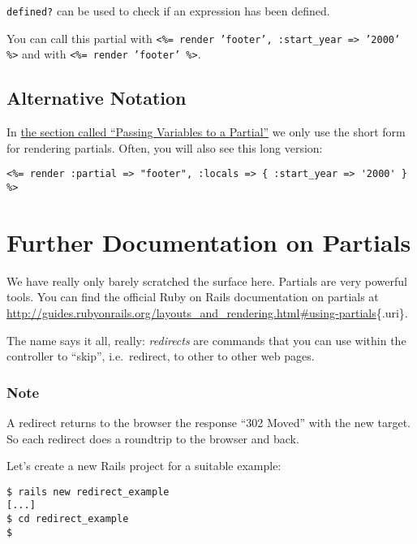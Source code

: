 \documentclass[a4paper]{book}
\newcounter{tab}[chapter]
\newcommand{\chap}[1]{\newpage\thispagestyle{empty}\chapter{#1}\label{chap:\thechapter}}
\begin{document}
\texttt{defined?} can be used to check if an expression has been defined.

You can call this partial with \texttt{\textless{}\%= render 'footer',         :start\_year =\textgreater{} '2000' \%\textgreater{}} and with \texttt{\textless{}\%= render         'footer' \%\textgreater{}}.

\section{Alternative Notation}\label{alternative-notation}

In \hyperref[partialsux5flocaleux5fvariables]{the section called “Passing Variables to a Partial”} we only use the short form for rendering partials. Often, you will also see this long version:

\begin{shaded}\begin{verbatim}
<%= render :partial => "footer", :locals => { :start_year => '2000' } %>
\end{verbatim}\end{shaded}

\chap{Further Documentation on Partials}\label{further-documentation-on-partials}

We have really only barely scratched the surface here. Partials are very powerful tools. You can find the official Ruby on Rails documentation on partials at \url{http://guides.rubyonrails.org/layouts_and_rendering.html\#using-partials}\{.uri\}.


The name says it all, really: \emph{redirects} are commands that you can use within the controller to “skip”, i.e.~redirect, to other to other web pages.

\subsection{Note}\label{note-18}

A redirect returns to the browser the response “302 Moved” with the new target. So each redirect does a roundtrip to the browser and back.

Let's create a new Rails project for a suitable example:

\begin{shaded}\begin{verbatim}
$ rails new redirect_example
[...]
$ cd redirect_example
$
\end{verbatim}\end{shaded}
\end{document}
